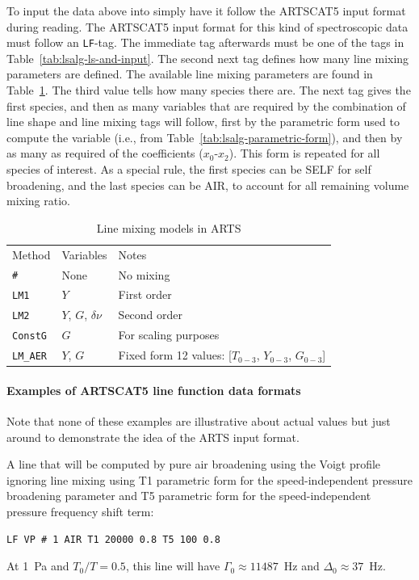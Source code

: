 To input the data above into simply have it follow the ARTSCAT5 input format during reading.
The ARTSCAT5 input format for this kind of spectroscopic data must follow an \verb|LF|-tag.
The immediate tag afterwards must be one of the tags in Table~\ref{tab:lsalg-ls-and-input}.
The second next tag defines how many line mixing parameters are defined.  The available
line mixing parameters are found in Table~\ref{tab:lsalg-mixing-forms}. The third value tells how many species there are.  The next tag gives the first species, and then as many variables
that are required by the combination of line shape and line mixing tags will follow, first by the parametric form used to compute the variable (i.e., from Table~\ref{tab:lsalg-parametric-form}), and then by as many as required of the coefficients ($x_0$-$x_2$).  This form is repeated for all species of interest.  As a special rule, the first species can be SELF for self broadening, and the last species can be AIR, to account for all remaining volume mixing ratio.

\begin{table}[ht!]
 \centering
 \begin{tabular}{ll|l}
  Method & Variables & Notes\\
  \verb|#| & None & No mixing\\
  \verb|LM1| & $Y$ & First order\\
  \verb|LM2| & $Y$, $G$, $\delta\nu$ & Second order \\
  \verb|ConstG| & $G$ & For scaling purposes\\
  \verb|LM_AER| & $Y$, $G$ & Fixed form 12 values: [$T_{0-3}$, $Y_{0-3}$, $G_{0-3}$]\\
 \end{tabular}
\caption{Line mixing models in ARTS}
\label{tab:lsalg-mixing-forms}
\end{table}

\paragraph*{Examples of ARTSCAT5 line function data formats}

Note that none of these examples are illustrative about actual values but just around to demonstrate the idea of the ARTS input format.

A line that will be computed by pure air broadening using the Voigt profile ignoring line mixing using T1 parametric form for the speed-independent pressure broadening parameter and T5 parametric form for the speed-independent pressure frequency shift term:
\begin{verbatim}
LF VP # 1 AIR T1 20000 0.8 T5 100 0.8
\end{verbatim}
At 1~Pa and $T_0/T = 0.5$, this line will have $\Gamma_0\approx11487$~Hz and $\Delta_0\approx37$~Hz.

